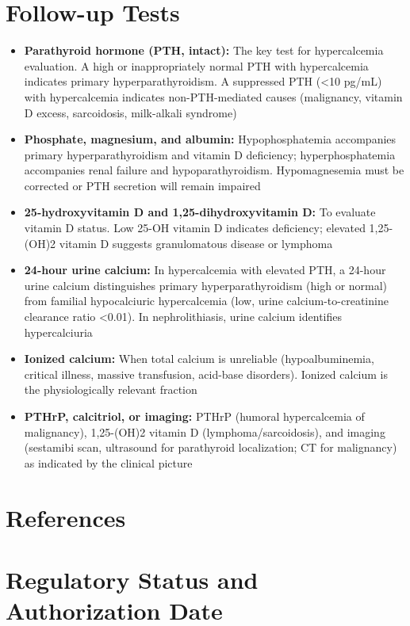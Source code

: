 \section*{Follow-up Tests}
\begin{itemize}
  \item \textbf{Parathyroid hormone (PTH, intact):} The key test for hypercalcemia evaluation. A high or inappropriately normal PTH with hypercalcemia indicates primary hyperparathyroidism. A suppressed PTH (<10 pg/mL) with hypercalcemia indicates non-PTH-mediated causes (malignancy, vitamin D excess, sarcoidosis, milk-alkali syndrome)
  \item \textbf{Phosphate, magnesium, and albumin:} Hypophosphatemia accompanies primary hyperparathyroidism and vitamin D deficiency; hyperphosphatemia accompanies renal failure and hypoparathyroidism. Hypomagnesemia must be corrected or PTH secretion will remain impaired
  \item \textbf{25-hydroxyvitamin D and 1,25-dihydroxyvitamin D:} To evaluate vitamin D status. Low 25-OH vitamin D indicates deficiency; elevated 1,25-(OH)2 vitamin D suggests granulomatous disease or lymphoma
  \item \textbf{24-hour urine calcium:} In hypercalcemia with elevated PTH, a 24-hour urine calcium distinguishes primary hyperparathyroidism (high or normal) from familial hypocalciuric hypercalcemia (low, urine calcium-to-creatinine clearance ratio <0.01). In nephrolithiasis, urine calcium identifies hypercalciuria
  \item \textbf{Ionized calcium:} When total calcium is unreliable (hypoalbuminemia, critical illness, massive transfusion, acid-base disorders). Ionized calcium is the physiologically relevant fraction
  \item \textbf{PTHrP, calcitriol, or imaging:} PTHrP (humoral hypercalcemia of malignancy), 1,25-(OH)2 vitamin D (lymphoma/sarcoidosis), and imaging (sestamibi scan, ultrasound for parathyroid localization; CT for malignancy) as indicated by the clinical picture
\end{itemize}

\section*{References}



\clearpage
\section*{Regulatory Status and Authorization Date}

\clearpage
